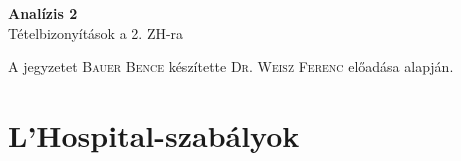 \documentclass[a4paper,11pt]{article}
\begin{document}
	\def\R{\mathbb{R}}
	\def\N{\mathbb{N}}
	\def\dab{\in\D(a,b)}
	\def\biz{\normalsize{\textbf{\underline{Bizonyítás:} }\hspace*{0.5cm}}}
	\def\tetel{\normalsize \textbf{Tétel: }}
	\def\rtr{\displaystyle\R\to\R}
	\def\D{\displaystyle\mathcal{D}}
	\def\bizva{\quad\blacksquare}
	\def\limaj{\displaystyle\lim_{a+0}}
	\def\limnj{\displaystyle\lim_{0+0}}
	\def\limh{\displaystyle\lim_{h\to0}}
	\def\Rv{\overline{\mathbb{R}}}
	\def\fabr{f:(a,b)\to\R}
	\def\itr{I\to\R}
	\def\prfv{primitív függvény}
	\def\rab{R[a,b]}
	\def\te{\tau_1}
	\def\tk{\tau_2}
	\def\ftau{(f,\tau)}
	\def\kab{K[a,b]}
	\def\cab{\in C[a,b]}
	\def\fab{F[a,b]}
	\def\sumi{\sum\limits_{i=1}^{n}}
	\def\intv{[x_{i-1},x_i]}
	\def\intab{\int\limits_{a}^{b}}
\begin{center}
	{\LARGE \textbf{Analízis 2}}\\[0.2cm]
	{\large Tételbizonyítások a 2. ZH-ra}
\end{center}
{\small A jegyzetet \textsc{Bauer Bence} készítette \textsc{Dr. Weisz Ferenc} előadása alapján.}
\section{L'Hospital-szabályok}
\end{document}
